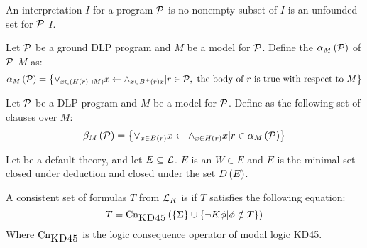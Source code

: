\begin{defi}
An interpretation $I$ for a program $\mathcal{P}$ is  \iffTx{} no nonempty subset of $I$ is an unfounded set for $\mathcal{P}$ \wrtTx{} $I$.
\cite{conf/ijcai/KochL99}
\end{defi}

\begin{defi}
Let $\mathcal{P}$ be a ground DLP program and $M$ be a model for $\mathcal{P}$. Define the  $\alpha_M\left(\mathcal{P}\right)$ of $\mathcal{P}$ \wrtTx{} $M$ as:
\begin{equation}
\alpha_M\left(\mathcal{P}\right)=\left\{ \displaystyle\vee_{x\in\left( H\left(r\right)\cap M\right)}x\leftarrow\displaystyle\wedge_{x\in B^+\left(r\right)x}|r\in\mathcal{P},\mbox{ the body of $r$ is true with respect to{} $M$}\right\}
\end{equation}
\cite{conf/ijcai/KochL99}
\end{defi}

\begin{defi}
Let $\mathcal{P}$ be a DLP program and $M$ be a model for $\mathcal{P}$. Define  as the following set of clauses over $M$:
\begin{equation}
\beta_M\left(\mathcal{P}\right)=\left\{ \displaystyle\vee_{x\in B\left(r\right)}x\leftarrow\displaystyle\wedge_{x\in H\left(r\right)}x|r\in\alpha_M\left(\mathcal{P}\right)\right\}
\end{equation}
\cite{conf/ijcai/KochL99}
\end{defi}

\begin{defi}
Let  be a default theory, and let $E\subseteq\mathcal{L}$. $E$ is an  \iffTx{} $W\in E$ and $E$ is the minimal set closed under deduction and closed under the set $D\left(E\right)$.
\cite{conf/ijcai/Rosati99}
\end{defi}

\begin{defi}
A consistent set of formulas $T$ from $\mathcal{L}_K$ is  if $T$ satisfies the following equation:
\begin{equation}
T=\mbox{Cn}_{\mbox{\sc KD45}}\left(\left\{ \Sigma\right\}\cup\left\{ \neg K\phi|\phi\notin T\right\}\right)
\end{equation}
Where $\mbox{Cn}_{\mbox{\sc KD45}}$ is the logic consequence operator of modal logic {\sc KD45}.
\cite{conf/ijcai/Rosati99}
\end{defi}